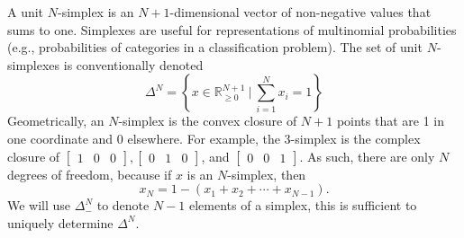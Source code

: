 \documentclass[11pt]{article}
\newcommand{\setcomp}[2]{\left\{ #1 \ \Big|\ #2 \right\}}
\begin{document}
%
%
%
%

A unit $N$-simplex is an $N + 1$-dimensional vector of non-negative
values that sums to one.  Simplexes are useful for representations of multinomial probabilities
(e.g., probabilities of categories in a classification problem). The set of unit $N$-simplexes is conventionally denoted
\[
  \Delta^N = \setcomp{x \in \mathbb{R}_{\ge 0}^{N + 1}}{ \sum_{i=1}^{N} x_i = 1}
\]
Geometrically, an $N$-simplex is the convex closure of $N+1$ points
that are 1 in one coordinate and 0 elsewhere.  For example, the
3-simplex is the complex closure of
$\begin{bmatrix}1 & 0 & 0 \end{bmatrix},
\begin{bmatrix} 0 & 1 & 0 \end{bmatrix}$,
and $\begin{bmatrix} 0 & 0 & 1 \end{bmatrix}$. As such, there are only $N$ degrees of
freedom, because if $x$ is an $N$-simplex, then
\[
  x_N = 1 - (x_1 + x_2 + \cdots + x_{N-1}).
\]
We will use $\Delta^N_-$ to denote $N-1$ elements of a simplex, this is sufficient to uniquely determine $\Delta^N$.
\end{document}

